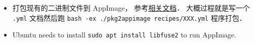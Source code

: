 
\begin{issues}
\issueDraft
\end{issues}

\begin{itemize}
\item 打包现有的二进制文件到 AppImage， 参考\href{https://docs.appimage.org/packaging-guide/converting-binary-packages/index.html#ref-convert-existing-binary-packages}{相关文档}． 大概过程就是写一个 \verb|.yml| 文档然后跑 \verb|bash -ex ./pkg2appimage recipes/XXX.yml| 程序打包．
\item Ubuntu needs to install \verb|sudo apt install libfuse2| to run AppImage.
\end{itemize}
